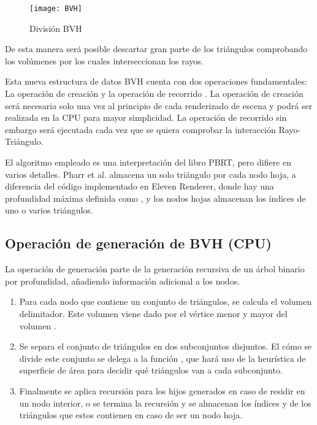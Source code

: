 \begin{figure}[H]
    \centering
	\texttt{[image: BVH]}
	\caption{División BVH}
	\label{fig:label}
\end{figure}

De esta manera será posible descartar gran parte de los triángulos comprobando los volúmenes por los cuales interseccionan los rayos.

Esta nueva estructura de datos BVH cuenta con dos operaciones fundamentales: La operación de creación  y la operación de recorrido . La operación de creación será necesaria solo una vez al principio de cada renderizado de escena y podrá ser realizada en la CPU para mayor simplicidad. La operación de recorrido sin embargo será ejecutada cada vez que se quiera comprobar la interacción Rayo-Triángulo.

El algoritmo empleado es una interpretación del libro PBRT, pero difiere en varios detalles. Pharr et al. \cite{pharr2016physically} almacena un solo triángulo por cada nodo hoja, a diferencia del código implementado en Eleven Renderer, donde hay una profundidad máxima definida como , y los nodos hojas almacenan los índices de uno o varios triángulos. 

\subsection{Operación de generación de BVH (CPU)}

La operación de generación parte de la generación recursiva de un árbol binario por profundidad, añadiendo información adicional a los nodos.

\begin{enumerate}
	
\item Para cada nodo que contiene un conjunto de triángulos, se calcula el volumen delimitador. Este volumen viene dado por el vértice menor y mayor del volumen .

\item Se separa el conjunto de triángulos en dos subconjuntos disjuntos. El cómo se divide este conjunto se delega a la función , que hará uso de la heurística de superficie de área para decidir qué triángulos van a cada subconjunto.

\item Finalmente se aplica recursión para los hijos generados en caso de residir en un nodo interior, o se termina la recursión y se almacenan los índices  y  de los triángulos que estos contienen en caso de ser un nodo hoja.

\end{enumerate}

